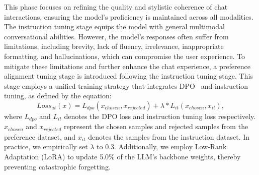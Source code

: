 

This phase focuses on refining the quality and stylistic coherence of chat interactions, ensuring the model's proficiency is maintained across all modalities.  The instruction tuning stage equips the model with general multimodal conversational abilities. However, the model's responses often suffer from limitations, including brevity, lack of fluency, irrelevance, inappropriate formatting, and hallucinations, which can compromise the user experience. To mitigate these limitations and further enhance the chat experience, a preference alignment tuning stage is introduced following the instruction tuning stage. This stage employs a unified training strategy that integrates DPO~\cite{rafailov2024directpreferenceoptimizationlanguage} and instruction tuning, as defined by the equation:
\begin{equation}\label{alignment_tuning}
Loss_{at}(x) = L_{dpo}(x_{chosen}, x_{rejected})+\lambda*L_{it}(x_{chosen}, x_{it}),
\end{equation}
where $L_{dpo}$ and $L_{it}$ denotes the DPO loss and instruction tuning loss respectively. $x_{chosen}$ and $x_{rejected}$ represent the chosen samples and rejected samples from the preference dataset, and $x_{it}$ denotes the samples from the instruction dataset. In practice, we empirically set $\lambda$ to 0.3.  Additionally, we employ Low-Rank Adaptation (LoRA) \cite{hu2021loralowrankadaptationlarge} to update 5.0\% of the LLM's backbone weights, thereby preventing catastrophic forgetting.

